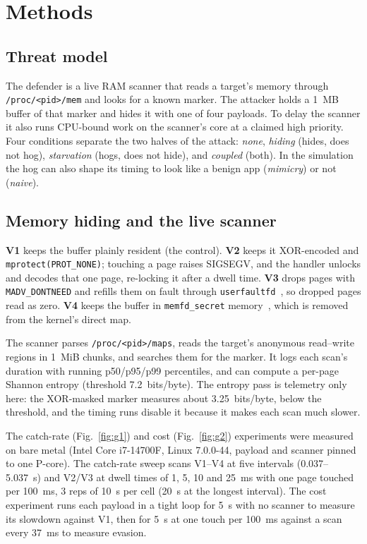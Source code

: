 \documentclass[conference]{IEEEtran}
\begin{document}
\section{Methods}

\subsection{Threat model}
The defender is a live RAM scanner that reads a target's memory through
\texttt{/proc/<pid>/mem} and looks for a known marker. The attacker holds a
1~MB buffer of that marker and hides it with one of four payloads. To delay the
scanner it also runs CPU-bound work on the scanner's core at a claimed high
priority. Four conditions separate the two halves of the attack: \emph{none},
\emph{hiding} (hides, does not hog), \emph{starvation} (hogs, does not hide),
and \emph{coupled} (both). In the simulation the hog can also shape its timing
to look like a benign app (\emph{mimicry}) or not (\emph{naive}).

\subsection{Memory hiding and the live scanner}
\textbf{V1} keeps the buffer plainly resident (the control). \textbf{V2} keeps
it XOR-encoded and \texttt{mprotect(PROT\_NONE)}; touching a page raises
SIGSEGV, and the handler unlocks and decodes that one page, re-locking it after
a dwell time. \textbf{V3} drops pages with \texttt{MADV\_DONTNEED} and refills
them on fault through \texttt{userfaultfd}~\cite{userfaultfd}, so dropped pages
read as zero. \textbf{V4} keeps the buffer in \texttt{memfd\_secret}
memory~\cite{memfd-secret}, which is removed from the kernel's direct map.

The scanner parses \texttt{/proc/<pid>/maps}, reads the target's anonymous
read--write regions in 1~MiB chunks, and searches them for the marker. It logs
each scan's duration with running p50/p95/p99 percentiles, and can compute a
per-page Shannon entropy (threshold 7.2~bits/byte). The entropy pass is
telemetry only here: the XOR-masked marker measures about 3.25~bits/byte, below
the threshold, and the timing runs disable it because it makes each scan much
slower.

The catch-rate (Fig.~\ref{fig:g1}) and cost (Fig.~\ref{fig:g2}) experiments
were measured on bare metal (Intel Core i7-14700F, Linux 7.0.0-44, payload and
scanner pinned to one P-core). The catch-rate sweep scans V1--V4 at five
intervals (0.037--5.037~s) and V2/V3 at dwell times of 1, 5, 10 and 25~ms with
one page touched per 100~ms, 3 reps of 10~s per cell (20~s at the longest
interval). The cost experiment runs each payload in a tight loop for 5~s with no scanner to
measure its slowdown against V1, then for 5~s at one touch per 100~ms against a
scan every 37~ms to measure evasion.
\end{document}

